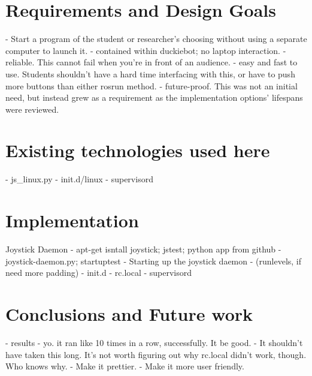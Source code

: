 \documentclass{article}
\begin{document}
\section{Requirements and Design Goals}
- Start a program of the student or researcher's choosing without using a
  separate computer to launch it. 
- contained within duckiebot; no laptop interaction.
- reliable. This cannot fail when you're in front of an audience. 
- easy and fast to use. Students shouldn't have a hard time interfacing with
  this, or have to push more buttons than either rosrun method. 
- future-proof. This was not an initial need, but instead grew as a
  requirement as the implementation options' lifespans were reviewed. 
\section{Existing technologies used here}
- js\_linux.py
- init.d/linux
- supervisord
\section{Implementation}
Joystick Daemon
  - apt-get isntall joystick; jstest; python app from github
  - joystick-daemon.py; startuptest
- Starting up the joystick daemon
  - (runlevels, if need more padding)
  - init.d
  - rc.local
  - supervisord
\section{Conclusions and Future work}
- results
- yo. it ran like 10 times in a row, successfully. It be good.
- It shouldn't have taken this long. It's not worth figuring out why
  rc.local didn't work, though. Who knows why.
- Make it prettier. 
- Make it more user friendly. 
\end{document}
